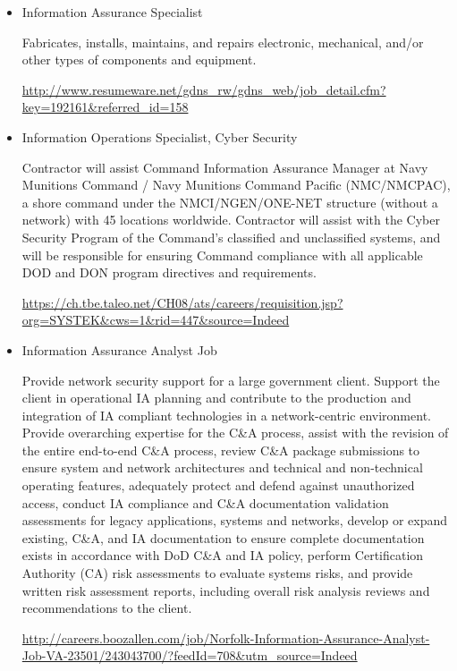 \documentclass[11pt]{article}
\begin{document}
\begin{flushleft}


\begin{itemize}

\item Information Assurance Specialist

Fabricates, installs, maintains, and repairs electronic, mechanical, and/or other types of components and equipment.

\url{http://www.resumeware.net/gdns_rw/gdns_web/job_detail.cfm?key=192161&referred_id=158}


\item Information Operations Specialist, Cyber Security

 Contractor will assist Command Information Assurance Manager at Navy Munitions Command / Navy Munitions Command Pacific (NMC/NMCPAC), a shore command under the NMCI/NGEN/ONE-NET structure (without a network) with 45 locations worldwide.  Contractor will assist with the Cyber Security Program of the Command’s classified and unclassified systems, and will be responsible for ensuring Command compliance with all applicable DOD and DON program directives and requirements.


\url{https://ch.tbe.taleo.net/CH08/ats/careers/requisition.jsp?org=SYSTEK&cws=1&rid=447&source=Indeed}



\item Information Assurance Analyst Job

Provide network security support for a large government client. Support the client in operational IA planning and contribute to the production and integration of IA compliant technologies in a network-centric environment. Provide overarching expertise for the C\&A process, assist with the revision of the entire end-to-end C\&A process, review C\&A package submissions to ensure system and network architectures and technical and non-technical operating features, adequately protect and defend against unauthorized access, conduct IA compliance and C\&A documentation validation assessments for legacy applications, systems and networks, develop or expand existing, C\&A, and IA documentation to ensure complete documentation exists in accordance with DoD C\&A and IA policy, perform Certification Authority (CA) risk assessments to evaluate systems risks, and provide written risk assessment reports, including overall risk analysis reviews and recommendations to the client.

\url{http://careers.boozallen.com/job/Norfolk-Information-Assurance-Analyst-Job-VA-23501/243043700/?feedId=708&utm_source=Indeed}


\end{itemize}
\end{flushleft}
\end{document}
